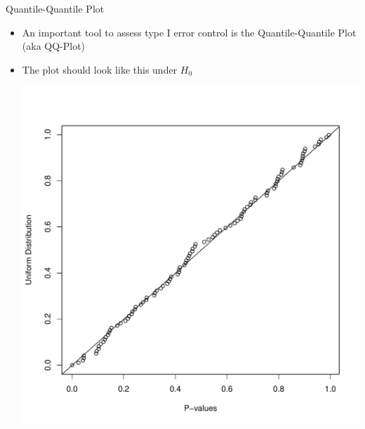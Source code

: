 \documentclass[xcolor=x11names,compress]{beamer}\usepackage[]{graphicx}\usepackage[]{color}
\newenvironment{knitrout}{}{} %
\begin{document}
\begin{frame}{Quantile-Quantile Plot}
  \begin{itemize}
  \item An important tool to assess type I error control is the
        Quantile-Quantile Plot (aka QQ-Plot)
  \item The plot should look like this under $H_0$
\begin{knitrout}\tiny
{}\color{fgcolor}

{\centering \includegraphics[width=.6\linewidth]{figure/beamer-unnamed-chunk-18-1} 

}



\end{knitrout}
  \end{itemize}
\end{frame}
\end{document}
